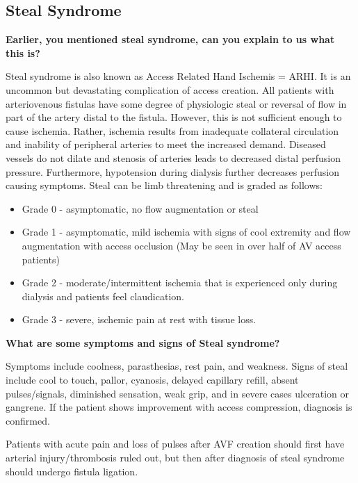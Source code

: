 \documentclass[
]{book}
\begin{document}
\hypertarget{sec-steal-syndrome}{%
\subsection{Steal Syndrome}\label{sec-steal-syndrome}}

\textbf{Earlier, you mentioned steal syndrome, can you explain to us what this
is?}

Steal syndrome is also known as Access Related Hand Ischemis = ARHI. It
is an uncommon but devastating complication of access creation. All
patients with arteriovenous fistulas have some degree of physiologic
steal or reversal of flow in part of the artery distal to the fistula.
However, this is not sufficient enough to cause ischemia. Rather,
ischemia results from inadequate collateral circulation and inability of
peripheral arteries to meet the increased demand. Diseased vessels do
not dilate and stenosis of arteries leads to decreased distal perfusion
pressure. Furthermore, hypotension during dialysis further decreases
perfusion causing symptoms. Steal can be limb threatening and is graded
as follows:

\begin{itemize}
\item
  Grade 0 - asymptomatic, no flow augmentation or steal
\item
  Grade 1 - asymptomatic, mild ischemia with signs of cool extremity
  and flow augmentation with access occlusion (May be seen in over
  half of AV access patients)\citep{leake2015}
\item
  Grade 2 - moderate/intermittent ischemia that is experienced only
  during dialysis and patients feel claudication.
\item
  Grade 3 - severe, ischemic pain at rest with tissue loss.
\end{itemize}

\textbf{What are some symptoms and signs of Steal syndrome?}

Symptoms include coolness, parasthesias, rest pain, and weakness. Signs
of steal include cool to touch, pallor, cyanosis, delayed capillary
refill, absent pulses/signals, diminished sensation, weak grip, and in
severe cases ulceration or gangrene. If the patient shows improvement
with access compression, diagnosis is confirmed.

Patients with acute pain and loss of pulses after AVF creation should
first have arterial injury/thrombosis ruled out, but then after
diagnosis of steal syndrome should undergo fistula
ligation.\citep{schanzer2004, yevzlin2016}
\end{document}
